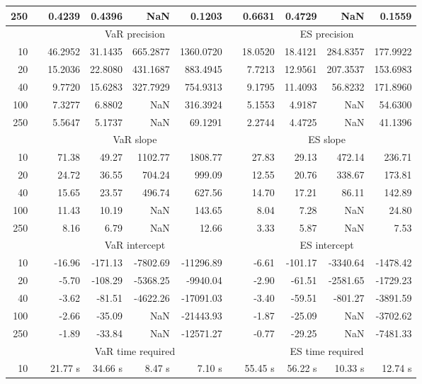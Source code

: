 {{\begin{longtable}{rr rrrr r rrrr}
250 && 0.4239  & 0.4396  &    NaN & 0.1203 && 0.6631  & 0.4729  &    NaN & 0.1559 \\ 
\hline 
 & & \multicolumn{4}{c}{VaR precision} &&  \multicolumn{4}{c}{ES precision} \\ \cline{3-6}  \cline{8-11}
10 && 46.2952 & 31.1435 & 665.2877 & 1360.0720 & & 18.0520 & 18.4121 & 284.8357 & 177.9922 \\ 
20 && 15.2036 & 22.8080 & 431.1687 & 883.4945 & & 7.7213 & 12.9561 & 207.3537 & 153.6983 \\ 
40 && 9.7720 & 15.6283 & 327.7929 & 754.9313 & & 9.1795 & 11.4093 & 56.8232 & 171.8960 \\ 
100 && 7.3277 & 6.8802 &    NaN & 316.3924 & & 5.1553 & 4.9187 &    NaN & 54.6300 \\ 
250 && 5.5647 & 5.1737 &    NaN & 69.1291 & & 2.2744 & 4.4725 &    NaN & 41.1396 \\ 
\hline 
 & & \multicolumn{4}{c}{ VaR slope} && \multicolumn{4}{c}{ES slope} \\ \cline{3-6}  \cline{8-11}
10 && 71.38 & 49.27 & 1102.77 & 1808.77 && 27.83 & 29.13 & 472.14 & 236.71 \\ 
20 && 24.72 & 36.55 & 704.24 & 999.09 && 12.55 & 20.76 & 338.67 & 173.81 \\ 
40 && 15.65 & 23.57 & 496.74 & 627.56 && 14.70 & 17.21 & 86.11 & 142.89 \\ 
100 && 11.43 & 10.19 &  NaN & 143.65 && 8.04 & 7.28 &  NaN & 24.80 \\ 
250 && 8.16 & 6.79 &  NaN & 12.66 && 3.33 & 5.87 &  NaN & 7.53 \\ 
\hline 
 & & \multicolumn{4}{c}{ VaR intercept} &&  \multicolumn{4}{c}{ES intercept} \\ \cline{3-6}  \cline{8-11}
10 && -16.96 & -171.13 & -7802.69 & -11296.89 && -6.61 & -101.17 & -3340.64 & -1478.42 \\ 
20 && -5.70 & -108.29 & -5368.25 & -9940.04 && -2.90 & -61.51 & -2581.65 & -1729.23 \\ 
40 && -3.62 & -81.51 & -4622.26 & -17091.03 && -3.40 & -59.51 & -801.27 & -3891.59 \\ 
100 && -2.66 & -35.09 &  NaN & -21443.93 && -1.87 & -25.09 &  NaN & -3702.62 \\ 
250 && -1.89 & -33.84 &  NaN & -12571.27 && -0.77 & -29.25 &  NaN & -7481.33 \\ 
\hline 
 & & \multicolumn{4}{c}{VaR time required} && \multicolumn{4}{c}{ES time required} \\ \cline{3-6}  \cline{8-11}
10 & & 21.77 s & 34.66 s & 8.47 s & 7.10 s && 55.45 s & 56.22 s & 10.33 s & 12.74 s \\ 

\end{longtable}}}
